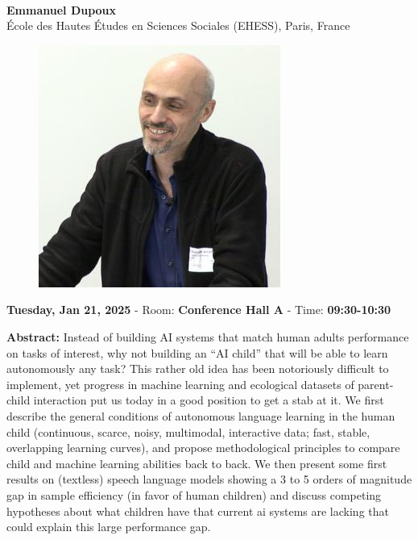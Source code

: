 {\centering
{}\\  \vspace*{-0.1cm} \leavevmode\newline
{\normalsize \textbf{Emmanuel Dupoux}}\\
{\normalsize {École des Hautes Études en Sciences Sociales (EHESS), Paris, France}}\\


\begin{figure}[h!]
  \centering
      \includegraphics[width=0.15\linewidth]{examples/handbook_coling25/invited_talks/emmanuel_dupoux_invited_1.png}
\end{figure}

 {\normalsize \textbf{Tuesday, Jan 21, 2025} -
 Room: \textbf{Conference Hall A} -
 Time: \textbf{09:30-10:30}\\\leavevmode\newline
 }
}

{\textbf{Abstract:}}
Instead of building AI systems that match human adults performance on tasks of interest, why not building an “AI child” that will be able to learn autonomously any task? This rather old idea has been notoriously difficult to implement, yet progress in machine learning and ecological datasets of parent- child interaction put us today in a good position to get a stab at it. We first describe the general conditions of autonomous language learning in the human child (continuous, scarce, noisy, multimodal, interactive data; fast, stable, overlapping learning curves), and propose methodological principles to compare child and machine learning abilities back to back. We then present some first results on (textless) speech language models showing a 3 to 5 orders of magnitude gap in sample efficiency (in favor of human children) and discuss competing hypotheses about what children have that current ai systems are lacking that could explain this large performance gap.\\

